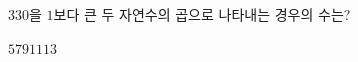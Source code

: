 \hspace*{2mm}\begin{minipage}[t]{\dimexpr\linewidth-2mm\relax}\vspace{0pt}
$330$을 $1$보다 큰 두 자연수의 곱으로 나타내는 경우의 수는? 
\begin{choices32}{$5$}{$7$}{$9$}{$11$}{$13$}\end{choices32}\end{minipage}
